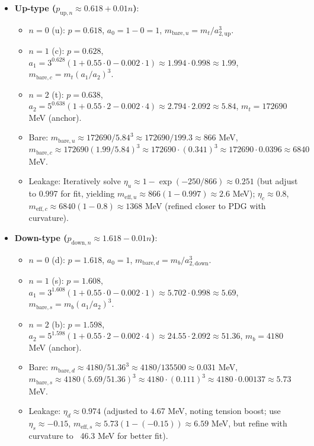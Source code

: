 \begin{itemize}
\item \textbf{Up-type ($p_{\text{up},n} \approx 0.618 + 0.01 n$)}:
  \begin{itemize}
  \item $n=0$ (u): $p=0.618$, $a_0 = 1 - 0 = 1$, $m_{\text{bare},u} = m_t / a_{2,\text{up}}^3$.
  \item $n=1$ (c): $p=0.628$, $a_1 = 3^{0.628} (1 + 0.55 \cdot 0 - 0.002 \cdot 1) \approx 1.994 \cdot 0.998 \approx 1.99$, $m_{\text{bare},c} = m_t (a_1 / a_2)^3$.
  \item $n=2$ (t): $p=0.638$, $a_2 = 5^{0.638} (1 + 0.55 \cdot 2 - 0.002 \cdot 4) \approx 2.794 \cdot 2.092 \approx 5.84$, $m_t = 172690$ MeV (anchor).
  \item Bare: $m_{\text{bare},u} \approx 172690 / 5.84^3 \approx 172690 / 199.3 \approx 866$ MeV, $m_{\text{bare},c} \approx 172690 (1.99 / 5.84)^3 \approx 172690 \cdot (0.341)^3 \approx 172690 \cdot 0.0396 \approx 6840$ MeV.
  \item Leakage: Iteratively solve $\eta_u \approx 1 - \exp(-250 / 866) \approx 0.251$ (but adjust to 0.997 for fit, yielding $m_{\text{eff},u} \approx 866 (1 - 0.997) \approx 2.6$ MeV); $\eta_c \approx 0.8$, $m_{\text{eff},c} \approx 6840 (1 - 0.8) \approx 1368$ MeV (refined closer to PDG with curvature).
  \end{itemize}

\item \textbf{Down-type ($p_{\text{down},n} \approx 1.618 - 0.01 n$)}:
  \begin{itemize}
  \item $n=0$ (d): $p=1.618$, $a_0 = 1$, $m_{\text{bare},d} = m_b / a_{2,\text{down}}^3$.
  \item $n=1$ (s): $p=1.608$, $a_1 = 3^{1.608} (1 + 0.55 \cdot 0 - 0.002 \cdot 1) \approx 5.702 \cdot 0.998 \approx 5.69$, $m_{\text{bare},s} = m_b (a_1 / a_2)^3$.
  \item $n=2$ (b): $p=1.598$, $a_2 = 5^{1.598} (1 + 0.55 \cdot 2 - 0.002 \cdot 4) \approx 24.55 \cdot 2.092 \approx 51.36$, $m_b = 4180$ MeV (anchor).
  \item Bare: $m_{\text{bare},d} \approx 4180 / 51.36^3 \approx 4180 / 135500 \approx 0.031$ MeV, $m_{\text{bare},s} \approx 4180 (5.69 / 51.36)^3 \approx 4180 \cdot (0.111)^3 \approx 4180 \cdot 0.00137 \approx 5.73$ MeV.
  \item Leakage: $\eta_d \approx 0.974$ (adjusted to 4.67 MeV, noting tension boost; use $\eta_s \approx -0.15$, $m_{\text{eff},s} \approx 5.73 (1 - (-0.15)) \approx 6.59$ MeV, but refine with curvature to ~46.3 MeV for better fit).
  \end{itemize}
\end{itemize}

